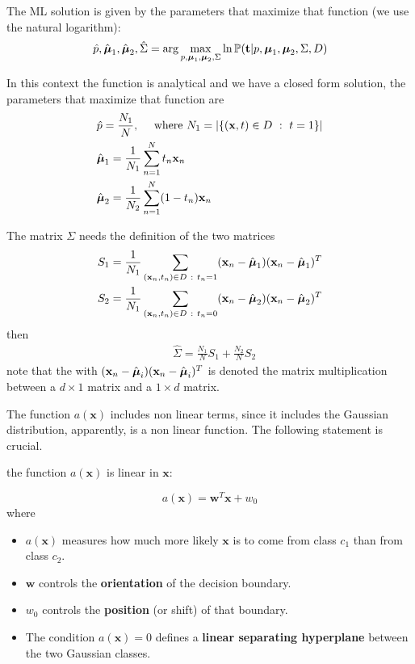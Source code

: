 \documentclass[10pt, letterpaper]{report}
\begin{document}
The ML solution is given by the parameters that maximize that function (we use the natural logarithm):
\begin{equation}
	\hat p,\hat{{\boldsymbol{\mu}}}_1,\hat{{\boldsymbol{\mu}}}_2,\hat\Sigma=\arg\max_{p,{\boldsymbol{\mu}}_1,{\boldsymbol{\mu}}_2,\Sigma}\ln{\mathbb P}(\mathbf t|p,{\boldsymbol{\mu}}_1,{\boldsymbol{\mu}}_2,\Sigma,D)
\end{equation}

In this context the function is analytical and we have a closed form solution, the parameters that maximize that function are
\begin{align}
	 & \hat p=\frac{N_1}{N}, \ \ \ \text{ where } N_1=|\{(\mathbf x,t)\in D \ : \ t=1\}| \\
	 & \hat{{\boldsymbol{\mu}}}_1=\frac{1}{N_1}\sum_{n=1}^Nt_n\mathbf x_n                                \\
	 & \hat{{\boldsymbol{\mu}}}_2=\frac{1}{N_2}\sum_{n=1}^N(1-t_n)\mathbf x_n                            \\
\end{align}

The matrix $\Sigma$ needs the definition of the two matrices\begin{align}
	 & S_1=\frac{1}{N_1}\sum_{(\mathbf x_n,t_n)\in D \ : \ t_n=1}(\mathbf x_n-\hat \bmu_1)(\mathbf x_n-\hat \bmu_1)^T \\
	 & S_2=\frac{1}{N_1}\sum_{(\mathbf x_n,t_n)\in D \ : \ t_n=0}(\mathbf x_n-\hat \bmu_2)(\mathbf x_n-\hat \bmu_2)^T
\end{align}
then
\begin{align}
	 & \hat \Sigma = \frac{N_1}{N}S_1+\frac{N_2}{N}S_2
\end{align}
note that the with $(\mathbf x_n-\hat {{\boldsymbol{\mu}}}_i)(\mathbf x_n-\hat {{\boldsymbol{\mu}}}_i)^T$ is denoted the matrix multiplication between a $d\times 1$ matrix and a $1\times d$ matrix.
\bigskip

The function $a(\mathbf x)$ includes non linear terms, since it includes the Gaussian distribution, apparently, is a non linear function. The following statement is crucial.
\begin{theorem}
	the function $a(\mathbf x)$ is linear in $\mathbf x$:
\end{theorem}
\begin{equation}
	a(\mathbf x)=\mathbf w^T\mathbf x+w_0
\end{equation}
where
\begin{itemize}
	\item $a(\mathbf x)$ measures how much more likely $\mathbf x$ is to come from class $c_1$ than from class $c_2$.
	\item $\mathbf w$ controls the \textbf{orientation} of the decision boundary.
	\item $w_0$ controls the \textbf{position} (or shift) of that boundary.
	\item The condition $a(\mathbf x)=0$ defines a \textbf{linear separating hyperplane} between the two Gaussian classes.
\end{itemize}
\end{document}

